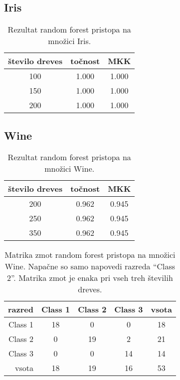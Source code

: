 \subsection{Iris}\label{subsec:random-forest-iris-test}
\begin{table}[H]
    \begin{center}
        \begin{tabular}{|| c | c c ||}
            \hline
            število dreves & točnost & MKK   \\
            \hline
            100            & 1.000   & 1.000 \\
            \hline
            150            & 1.000   & 1.000 \\
            \hline
            200            & 1.000   & 1.000 \\
            \hline
        \end{tabular}
    \end{center}
    \caption{Rezultat random forest pristopa na množici Iris.}
    \label{tab:rforest_iris_result}
\end{table}

\subsection{Wine}\label{subsec:random-forest-wine-test}
\begin{table}[H]
    \begin{center}
        \begin{tabular}{|| c | c c ||}
            \hline
            število dreves & točnost & MKK   \\
            \hline
            200            & 0.962   & 0.945 \\
            \hline
            250            & 0.962   & 0.945 \\
            \hline
            350            & 0.962   & 0.945 \\
            \hline
        \end{tabular}
    \end{center}
    \caption{Rezultat random forest pristopa na množici Wine.}
    \label{tab:rforest_wine_result}
\end{table}

\begin{table}[H]
    \centering
    \begin{tabular}{||rcccc||}
        \hline
        razred  & Class 1 & Class 2 & Class 3 & vsota \\ \hline
        Class 1 & 18      & 0       & 0       & 18    \\ \hline
        Class 2 & 0       & 19      & 2       & 21    \\ \hline
        Class 3 & 0       & 0       & 14      & 14    \\ \hline
        vsota   & 18      & 19      & 16      & 53    \\ \hline
    \end{tabular}
    \caption{Matrika zmot random forest pristopa na množici Wine. Napačne so samo napovedi razreda \enquote{Class 2}.
    Matrika zmot je enaka pri vseh treh številih dreves.}
    \label{tab:rforest_wine_cm}
\end{table}

